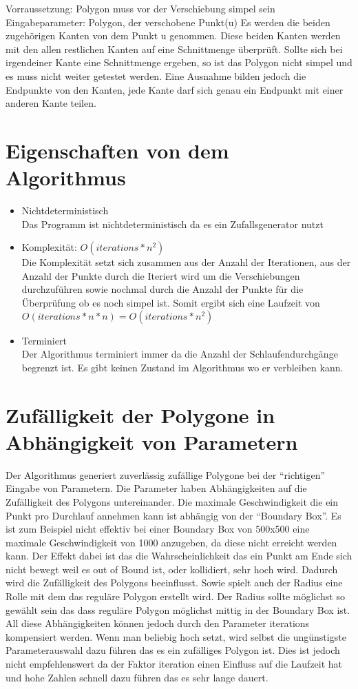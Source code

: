 Vorraussetzung: Polygon muss vor der Verschiebung simpel sein
Eingabeparameter: Polygon, der verschobene Punkt(u)
Es werden die beiden zugehörigen Kanten von dem Punkt u genommen. Diese beiden Kanten werden mit den allen restlichen Kanten auf eine Schnittmenge überprüft. Sollte sich bei irgendeiner Kante eine Schnittmenge ergeben, so ist das Polygon nicht simpel und es muss nicht weiter getestet werden. Eine Ausnahme bilden jedoch die Endpunkte von den Kanten, jede Kante darf sich genau ein Endpunkt mit einer anderen Kante teilen.


\section{Eigenschaften von dem Algorithmus}
\begin{itemize}
	\item Nichtdeterministisch\\
	Das Programm ist nichtdeterministisch da es ein Zufallsgenerator nutzt
	\item Komplexität: $O(iterations*n^2)$\\
	Die Komplexität setzt sich zusammen aus der Anzahl der Iterationen, aus der Anzahl der Punkte durch die Iteriert wird um die Verschiebungen durchzuführen sowie nochmal durch die Anzahl der Punkte für die Überprüfung ob es noch simpel ist. Somit ergibt sich eine Laufzeit von $O(iterations*n*n) = O(iterations*n^2)$
	\item Terminiert\\
	Der Algorithmus terminiert immer da die Anzahl der Schlaufendurchgänge begrenzt ist. Es gibt keinen Zustand im Algorithmus wo er verbleiben kann.
\end{itemize}

\section{Zufälligkeit der Polygone in Abhängigkeit von Parametern}
Der Algorithmus generiert zuverlässig zufällige Polygone bei der \enquote{richtigen} Eingabe von Parametern. Die Parameter haben Abhängigkeiten auf die Zufälligkeit des Polygons untereinander.
Die maximale Geschwindigkeit die ein Punkt pro Durchlauf annehmen kann ist abhängig von der \enquote{Boundary Box}. Es ist zum Beispiel nicht effektiv bei einer Boundary Box von 500x500 eine maximale Geschwindigkeit von 1000 anzugeben, da diese nicht erreicht werden kann. Der Effekt dabei ist das die Wahrscheinlichkeit das ein Punkt am Ende sich nicht bewegt weil es out of Bound ist, oder kollidiert, sehr hoch wird. Dadurch wird die Zufälligkeit des Polygons beeinflusst.
Sowie spielt auch der Radius eine Rolle mit dem das reguläre Polygon erstellt wird. Der Radius sollte möglichst so gewählt sein das dass reguläre Polygon möglichst mittig in der Boundary Box ist.
All diese Abhängigkeiten können jedoch durch den Parameter iterations kompensiert werden. Wenn man beliebig hoch setzt, wird selbst die ungünstigste Parameterauswahl dazu führen das es ein zufälliges Polygon ist.
Dies ist jedoch nicht empfehlenswert da der Faktor iteration einen Einfluss auf die Laufzeit hat und hohe Zahlen schnell dazu führen das es sehr lange dauert.